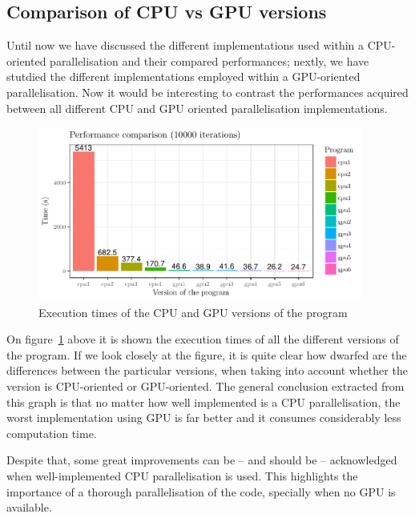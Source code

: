 \subsection{Comparison of CPU vs GPU versions}
Until now we have discussed the different implementations used within a CPU-oriented parallelisation and their compared performances; nextly, we have stutdied the different implementations employed within a GPU-oriented parallelisation. Now it would be interesting to contrast the performances acquired between all different CPU and GPU oriented parallelisation implementations.
\begin{figure}[H]
	\centering
	\includegraphics[width=0.95\textwidth]{images/times-all}
	\caption{Execution times of the CPU and GPU versions of the program}
	\label{fig:times-all}
\end{figure}

On figure~\ref{fig:times-all} above it is shown the execution times of all the different versions of the program. If we look closely at the figure, it is quite clear how dwarfed are the differences between the particular versions, when taking into account whether the version is CPU-oriented or GPU-oriented. The general conclusion extracted from this graph is that no matter how well implemented is a CPU parallelisation, the worst implementation using GPU is far better and it consumes considerably less computation time.

Despite that, some great improvements can be -- and should be -- acknowledged when well-implemented CPU parallelisation is used. This highlights the importance of a thorough parallelisation of the code, specially when no GPU is available.



